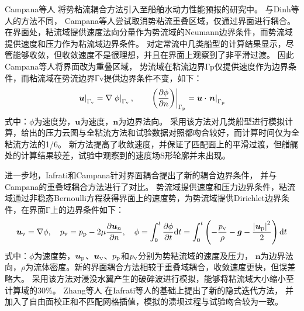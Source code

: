 Campana等人\cite{campanaDomainDecompositionFree1994,campanaViscousinviscidCouplingFree1995}%
将势粘流耦合方法引入至船舶水动力性能预报的研究中。%
与Dinh等人\cite{dinhCouplingViscousInviscid1988}的方法不同，%
Campana等人\cite{campanaDomainDecompositionFree1994}尝试取消势粘流重叠区域，仅通过界面进行耦合。%
在界面处，粘流域提供速度法向分量作为势流域的Neumann边界条件，而势流域提供速度和压力作为粘流域边界条件。%
对定常流中几类船型的计算结果显示，尽管能够收敛，但收敛速度不是很理想，并且在界面上观察到了非平滑过渡。%
因此Campana等人\cite{campanaViscousinviscidCouplingFree1995}将界面改为重叠区域，%
势流域在粘流边界Гp仅提供速度作为边界条件，而粘流域在势流边界Гv提供边界条件不变，如下：%
\begin{equation}
	\left.\bm{u}\right|_{\Gamma_{\rm{v}}} = \nabla\left.\phi\right|_{\Gamma_{\rm{v}}}, \qquad
	\left.\left(\frac{\partial \phi}{\partial n}\right)\right|_{\Gamma_{\rm{p}}} = \bm{u}\cdot\left.\bm{n}\right|_{\Gamma_{\rm{p}}}
\end{equation}
式中：$\phi$为速度势，$\bm{u}$为速度，$\bm{n}$为边界法向。%
采用该方法对几类船型进行模拟计算，给出的压力云图与全粘流方法和试验数据对照都吻合较好，而计算时间仅为全粘流方法的1/6。%
新方法提高了收敛速度，并保证了匹配面上的平滑过渡，但艏艉处的计算结果较差，试验中观察到的速度场S形轮廓并未出现。%

进一步地，Iafrati和Campana\cite{iafratiDomainDecompositionApproach2003}针对界面耦合提出了新的耦合边界条件，%
并与Campana\cite{campanaViscousinviscidCouplingFree1995}的重叠域耦合方法进行了对比。%
势流域提供速度和压力边界条件，粘流域通过非稳态Bernoulli方程获得界面上的速度势，为势流域提供Dirichlet边界条件，在界面Г上的边界条件如下：%
\begin{equation}
	\bm{u}_{\rm{v}} = \nabla \phi,\quad 
	p_{\rm{v}} = p_{\rm{p}} - 2\mu \frac{\partial \bm{u}_n}{\partial n}, \quad
	\phi = \int_{0}^{t}\frac{\partial \phi}{\partial t} {\rm{d}} t 
	= \int_{0}^{t} \left(-\frac{p_{\rm{v}}}{\rho} - \bm{g} - \frac{\left|\bm{u}_{\rm{p}}\right|^2}{2}\right) {\rm{d}} t 
\end{equation}
式中：$\phi$为速度势，$\bm{u}_{\rm{p}}$、$\bm{u}_{\rm{v}}$、$p_{\rm{p}}$和$p_{\rm{v}}$分别为势粘流域的速度及压力，%
$\bm{n}$为边界法向，$\rho$为流体密度。新的界面耦合方法相较于重叠域耦合，收敛速度更快，但误差略大。%
采用该方法对浸没水翼产生的破碎波进行模拟，能够将粘流域大小缩小至计算域的30\%。%
Zhang等人\cite{zhangCouplingViscousPotential2013,zhangSolitaryWaveBreaking2015}%
在Iafrati等人\cite{iafratiDomainDecompositionApproach2003}的基础上提出了新的隐式迭代方法，%
并加入了自由面校正和不匹配网格插值，模拟的溃坝过程与试验吻合较为一致。


